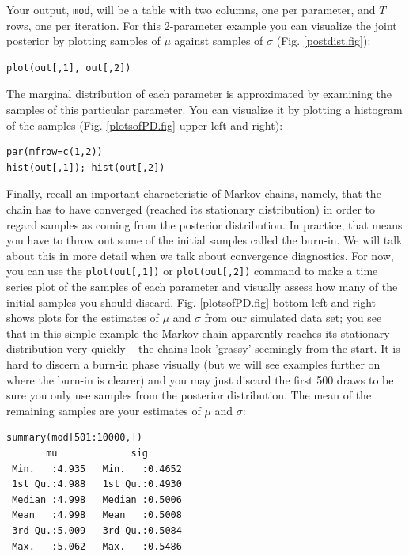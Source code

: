 Your output, \verb#mod#, will be a table with two columns, one per
parameter, and $T$ rows, one per iteration. For this 2-parameter example
you can visualize the joint posterior by plotting samples of $\mu$
against samples of $\sigma$ (Fig. \ref{postdist.fig}):
\begin{verbatim}
plot(out[,1], out[,2])
\end{verbatim}
The marginal distribution of each parameter is approximated by
examining the samples of this particular parameter. You can visualize
it by plotting a histogram of the samples (Fig. \ref{plotsofPD.fig} upper left and right):
\begin{verbatim}
par(mfrow=c(1,2))
hist(out[,1]); hist(out[,2])
\end{verbatim}

Finally, recall an important characteristic of Markov chains, namely,
that the chain has to have converged (reached its stationary
distribution) in order to regard samples as coming from the posterior distribution. In
practice, that means you have to throw out some of the initial samples
called the burn-in. We will talk about this in more detail when we talk
about convergence diagnostics. For now, you can use the
\verb#plot(out[,1])# or \verb#plot(out[,2])# command to make a time
series plot of the samples of each parameter and visually assess how
many of the initial samples you should discard. Fig. \ref{plotsofPD.fig} bottom left and right shows
plots for the estimates of $\mu$ and $\sigma$ from our simulated data set;
you see that in this simple example the Markov chain apparently
reaches its stationary distribution very quickly -- the chains look
'grassy' seemingly from the start. It is hard to discern a burn-in
phase visually (but we will see examples further on where the burn-in
is clearer) and you may just discard the first 500 draws to be sure
you only use samples from the posterior distribution. The mean of the
remaining samples are your estimates of $\mu$ and $\sigma$:
\begin{verbatim}
summary(mod[501:10000,])
       mu             sig        
 Min.   :4.935   Min.   :0.4652  
 1st Qu.:4.988   1st Qu.:0.4930  
 Median :4.998   Median :0.5006  
 Mean   :4.998   Mean   :0.5008  
 3rd Qu.:5.009   3rd Qu.:0.5084  
 Max.   :5.062   Max.   :0.5486  
\end{verbatim}

